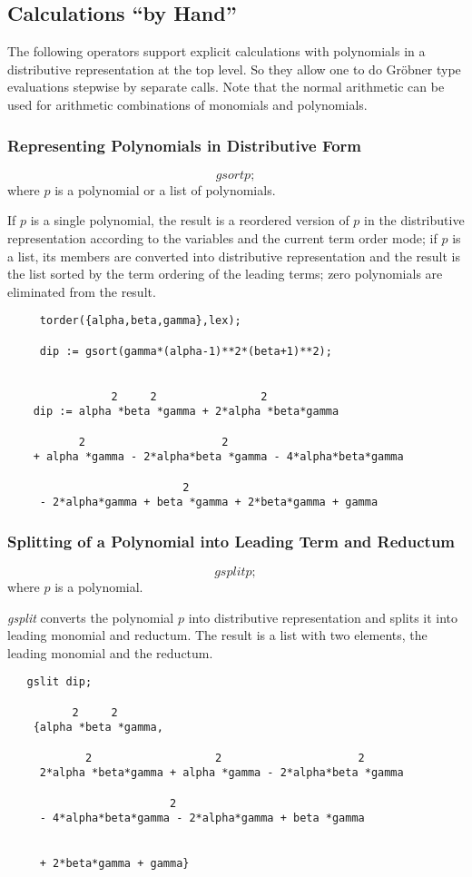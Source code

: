 \subsection{Calculations ``by Hand''}
The following operators support explicit calculations with
polynomials in a distributive representation at the \REDUCE top level.
So they allow one to do Gr\"obner type evaluations stepwise by
separate calls. Note that the normal \REDUCE arithmetic can be used
for arithmetic combinations of monomials and polynomials.

\subsubsection{Representing Polynomials in Distributive Form}
\[ gsort p; \]
where $p$ is a polynomial or a list of polynomials.

If $p$ is a single polynomial, the result is a reordered version of $p$
in the distributive representation according to the variables and the
current term order mode; if $p$ is a list, its members are converted
into distributive representation and the result is the list sorted by
the term ordering of the leading terms; zero polynomials are
eliminated from the result.

\begin{verbatim}
     torder({alpha,beta,gamma},lex);

     dip := gsort(gamma*(alpha-1)**2*(beta+1)**2);


                2     2                2
    dip := alpha *beta *gamma + 2*alpha *beta*gamma

           2                     2
    + alpha *gamma - 2*alpha*beta *gamma - 4*alpha*beta*gamma

                           2
     - 2*alpha*gamma + beta *gamma + 2*beta*gamma + gamma
\end{verbatim}

\subsubsection{Splitting of a Polynomial into Leading Term and Reductum}
\[ gsplit p; \]
where $p$ is a polynomial.

\emph{gsplit} converts the polynomial $p$ into distributive representation
and splits it into leading monomial and reductum. The result is a list
with two elements, the leading monomial and the reductum.

\begin{verbatim}
   gslit dip;

          2     2
    {alpha *beta *gamma,

            2                   2                     2
     2*alpha *beta*gamma + alpha *gamma - 2*alpha*beta *gamma

                         2
     - 4*alpha*beta*gamma - 2*alpha*gamma + beta *gamma


     + 2*beta*gamma + gamma}
\end{verbatim}

